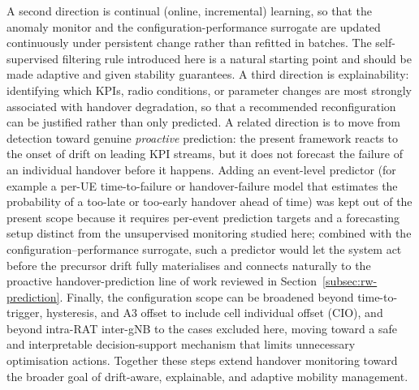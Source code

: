A second direction is continual (online, incremental) learning, so that the
anomaly monitor and the configuration-performance surrogate are updated
continuously under persistent change rather than refitted in batches. The
self-supervised filtering rule introduced here is a natural starting point and
should be made adaptive and given stability guarantees. A third direction is
explainability: identifying which KPIs, radio conditions, or parameter changes
are most strongly associated with handover degradation, so that a recommended
reconfiguration can be justified rather than only predicted. A related direction
is to move from detection toward genuine \emph{proactive} prediction: the present
framework reacts to the onset of drift on leading KPI streams, but it does not
forecast the failure of an individual handover before it happens. Adding an
event-level predictor (for example a per-UE time-to-failure or
handover-failure model that estimates the probability of a too-late or too-early
handover ahead of time) was kept out of the present scope because it requires
per-event prediction targets and a forecasting setup distinct from the
unsupervised monitoring studied here; combined with the configuration--performance
surrogate, such a predictor would let the system act before the precursor drift
fully materialises and connects naturally to the proactive handover-prediction
line of work reviewed in Section~\ref{subsec:rw-prediction}. Finally, the
configuration scope can be broadened beyond time-to-trigger, hysteresis, and A3
offset to include cell individual offset (CIO), and beyond intra-RAT inter-gNB to
the cases excluded here, moving toward a safe and interpretable decision-support
mechanism that limits unnecessary optimisation actions. Together these steps
extend handover monitoring toward the broader goal of drift-aware, explainable,
and adaptive mobility management.
